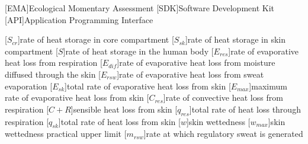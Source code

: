 \begin{acronym}[longest]
[EMA]{Ecological Momentary Assessment}
[SDK]{Software Development Kit}
[API]{Application Programming Interface}

[$S_{cr}$]{rate of heat storage in core compartment}
[$S_{sk}$]{rate of heat storage in skin compartment}
[$S$]{rate of heat storage in the human body}
[$E_{res}$]{rate of evaporative heat loss from respiration}
[$E_{dif}$]{rate of evaporative heat loss from moisture diffused through the skin}
[$E_{rsw}$]{rate of evaporative heat loss from sweat evaporation}
[$E_{sk}$]{total rate of evaporative heat loss from skin}
[$E_{max}$]{maximum rate of evaporative heat loss from skin}
[$C_{res}$]{rate of convective heat loss from respiration}
[$C + R$]{sensible heat loss from skin}
[$q_{res}$]{total rate of heat loss through respiration}
[$q_{sk}$]{total rate of heat loss from skin}
[$w$]{skin wettedness}
[$w_{max}$]{skin wettedness practical upper limit}
[$m_{rsw}$]{rate at which regulatory sweat is generated} %

\end{acronym}
\renewcommand{\baselinestretch}{1}\normalsize
